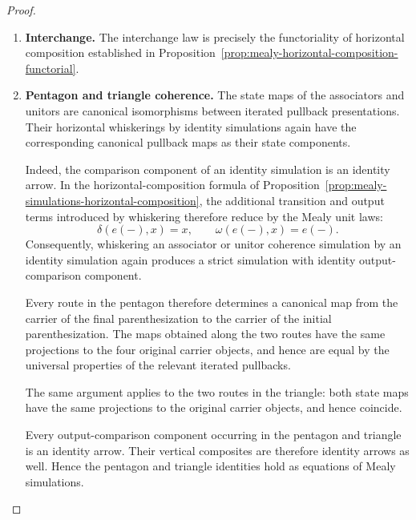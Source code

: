 \begin{proof}
\begin{enumerate}
        By Lemma~\ref{lem:span-coherence-strict-mealy}, these maps, equipped
        with identity output comparisons, are invertible strict Mealy
        simulations. By Lemma~\ref{lem:pipeline-coherence-naturality}, they are
        natural with respect to arbitrary Mealy simulations.

        \item \textbf{Interchange.}
        The interchange law is precisely the functoriality of horizontal
        composition established in
        Proposition~\ref{prop:mealy-horizontal-composition-functorial}.

        \item \textbf{Pentagon and triangle coherence.}
        The state maps of the associators and unitors are canonical
        isomorphisms between iterated pullback presentations. Their horizontal
        whiskerings by identity simulations again have the corresponding
        canonical pullback maps as their state components.

        Indeed, the comparison component of an identity simulation is an
        identity arrow. In the horizontal-composition formula of
        Proposition~\ref{prop:mealy-simulations-horizontal-composition}, the
        additional transition and output terms introduced by whiskering
        therefore reduce by the Mealy unit laws:
        \[
            \delta(e(-),x)=x,
            \qquad
            \omega(e(-),x)=e(-).
        \]
        Consequently, whiskering an associator or unitor coherence simulation
        by an identity simulation again produces a strict simulation with
        identity output-comparison component.

        Every route in the pentagon therefore determines a canonical map from
        the carrier of the final parenthesization to the carrier of the
        initial parenthesization. The maps obtained along the two routes have
        the same projections to the four original carrier objects, and hence
        are equal by the universal properties of the relevant iterated
        pullbacks.

        The same argument applies to the two routes in the triangle: both
        state maps have the same projections to the original carrier objects,
        and hence coincide.

        Every output-comparison component occurring in the pentagon and
        triangle is an identity arrow. Their vertical composites are therefore
        identity arrows as well. Hence the pentagon and triangle identities
        hold as equations of Mealy simulations.


\end{enumerate}
\end{proof}

